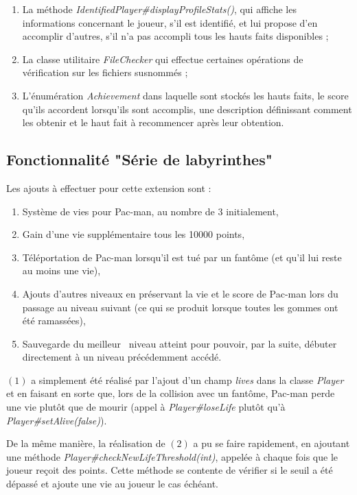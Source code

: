 \documentclass[12pt, openany]{report}
\begin{document}
\begin{enumerate}
\item La méthode \mbox{\textit{IdentifiedPlayer\#displayProfileStats()}}, qui affiche les informations concernant le joueur, s'il est identifié, et lui propose d'en accomplir d'autres, s'il n'a pas accompli tous les hauts faits disponibles ;
\item La classe utilitaire \mbox{\textit{FileChecker}} qui effectue certaines opérations de vérification sur les fichiers susnommés ;
\item L'énumération \mbox{\textit{Achievement}} dans laquelle sont stockés les hauts faits, le score qu'ils accordent lorsqu'ils sont accomplis, une description définissant comment les obtenir et le haut fait à recommencer après leur obtention.
\end{enumerate}


\subsection{Fonctionnalité "Série de labyrinthes"}\label{labyrinthe}
Les ajouts à effectuer pour cette extension sont :
\begin{enumerate}
	\item Système de vies pour Pac-man, au nombre de 3 initialement,
	\item Gain d'une vie supplémentaire tous les 10000 points,
	\item Téléportation de Pac-man lorsqu'il est tué par un fantôme (et qu'il lui reste au moins une vie),
	\item Ajouts d'autres niveaux en préservant la vie et le score de Pac-man lors du passage au niveau suivant (ce qui se produit lorsque toutes les gommes ont été ramassées),
	\item Sauvegarde du \og meilleur \fg \, niveau atteint pour pouvoir, par la suite, débuter directement à un niveau précédemment accédé.
\end{enumerate} 

$(1)$ a simplement été réalisé par l'ajout d'un champ \mbox{\textit{lives}} dans la classe \mbox{\textit{Player}} et en faisant en sorte que, lors de la collision avec un fantôme, Pac-man perde une vie plutôt que de mourir (appel à \mbox{\textit{Player\#loseLife}} plutôt qu'à \mbox{\textit{Player\#setAlive(false)}}).

De la même manière, la réalisation de $(2)$ a pu se faire rapidement, en ajoutant une méthode \mbox{\textit{Player\#checkNewLifeThreshold(int)}}, appelée à chaque fois que le joueur reçoit des points. Cette méthode se contente de vérifier si le seuil a été dépassé et ajoute une vie au joueur le cas échéant.
\end{document}
